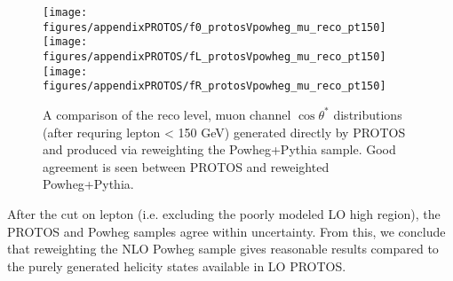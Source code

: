 \begin{figure}[htbp]
\begin{center}
		\texttt{[image: figures/appendixPROTOS/f0\_protosVpowheg\_mu\_reco\_pt150]}
		\texttt{[image: figures/appendixPROTOS/fL\_protosVpowheg\_mu\_reco\_pt150]}
		\texttt{[image: figures/appendixPROTOS/fR\_protosVpowheg\_mu\_reco\_pt150]}
	\caption{A comparison of the reco level, muon channel $\cos\theta^*$ distributions (after requring lepton \pt < 150 GeV) generated directly by PROTOS and produced via reweighting the Powheg+Pythia sample. Good agreement is seen between PROTOS and reweighted Powheg+Pythia.}
	\label{fig:powhegVprotos_mu_reco_pt150}
\end{center}	
\end{figure}

After the cut on lepton \pt (i.e. excluding the poorly modeled LO high \pt region), the PROTOS and Powheg samples agree within uncertainty. From this, we conclude that reweighting the NLO Powheg sample gives reasonable results compared to the purely generated helicity states available in LO PROTOS.
